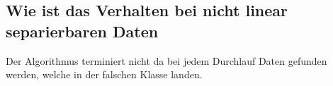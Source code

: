 \documentclass[]{report}
\begin{document}
\subsection{Wie ist das Verhalten bei nicht linear separierbaren Daten}

Der Algorithmus terminiert nicht da bei jedem Durchlauf Daten gefunden werden, welche in der falschen Klasse landen.
\end{document}
